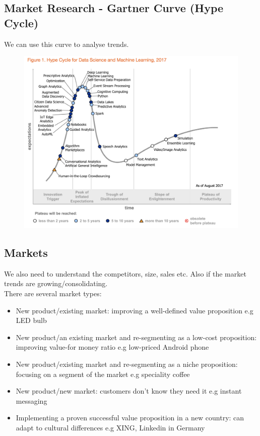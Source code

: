 \documentclass{article}
\begin{document}
\subsection{Market Research - Gartner Curve (Hype Cycle)}
We can use this curve to analyse trends.
\begin{figure}[H]
    \centering
\includegraphics[width=0.6\linewidth]{Pictures/Screenshot 2023-02-15 at 14.18.38.png}
\end{figure}
\subsection{Markets}
We also need to understand the competitors, size, sales etc. Also if the market trends are growing/consolidating. \\
There are several market types:
\begin{itemize}
    \item New product/existing market: improving a well-defined value proposition e.g LED bulb
    \item New product/an existing market and re-segmenting as a low-cost proposition: improving value-for money ratio e.g low-priced Android phone
    \item New product/existing market and re-segmenting as a niche proposition: focusing on a segment of the market e.g speciality coffee
    \item New product/new market: customers don't know they need it e.g instant messaging
    \item Implementing a proven successful value proposition in a new country: can adapt to cultural differences e.g XING, Linkedin in Germany
\end{itemize}
\end{document}
